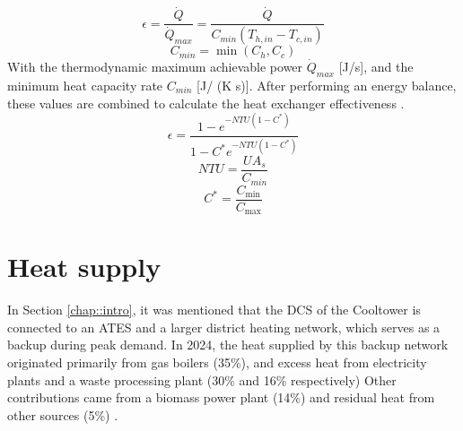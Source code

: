 \begin{equation}\label{eq::epsilon}
    \epsilon = \frac{\dot{Q}}{\dot{Q}_{max}} = \frac{\dot{Q}}{{C}_{min}(T_{h,in} - T_{c,in})}
\end{equation}
\begin{equation}
    C_{min} = \min(C_h, C_c)
\end{equation}
With the thermodynamic maximum achievable power $\dot{Q}_{max}$ [J/s], and the minimum heat capacity rate $C_{min}$ [J/ (K s)]. After performing an energy balance, these values are combined to calculate the heat exchanger effectiveness \cite{cengel2025heat}.
\begin{equation}
    \epsilon = \frac{1 - e^{-NTU  (1 - C^*)}}{1 - C^*  e^{-NTU (1 - C^*)}}
\end{equation}
\begin{equation}
    NTU = \frac{U A_s}{C_{min}}
\end{equation}
\begin{equation}
    C^{*} = \frac{C_{\min}}{C_{\max}}
\end{equation}

\section{Heat supply}
In Section \ref{chap::intro}, it was mentioned that the DCS of the Cooltower is connected to an ATES and a larger district heating network, which serves as a backup during peak demand. In 2024, the heat supplied by this backup network originated primarily from gas boilers (35\%), and excess heat from electricity plants and a waste processing plant (30\% and 16\% respectively) Other contributions came from a biomass power plant (14\%) and residual heat from other sources (5\%) \cite{heatsupply}. 

